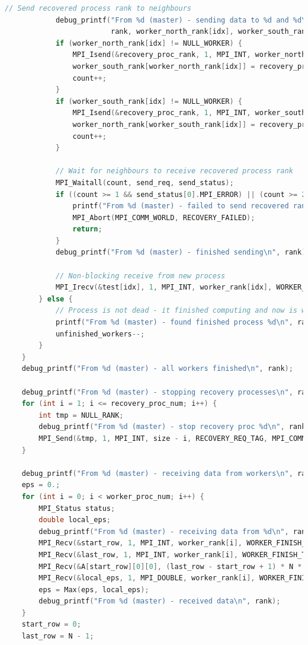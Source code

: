 \documentclass[a4paper]{article}
\begin{document}
\begin{lstlisting}[caption=jac\_3d\_mpi\_ft.c, label={lst:2}, language=C]
            // Send recovered process rank to neighbours
            debug_printf("From %d (master) - sending data to %d and %d\n",
                         rank, worker_north_rank[idx], worker_south_rank[idx]);
            if (worker_north_rank[idx] != NULL_WORKER) {
                MPI_Isend(&recovery_proc_rank, 1, MPI_INT, worker_north_rank[idx], RECOVERY_REQ_TAG, MPI_COMM_WORLD, &send_req[count]);
                worker_south_rank[worker_north_rank[idx]] = recovery_proc_rank;
                count++;
            }
            if (worker_south_rank[idx] != NULL_WORKER) {
                MPI_Isend(&recovery_proc_rank, 1, MPI_INT, worker_south_rank[idx], RECOVERY_REQ_TAG, MPI_COMM_WORLD, &send_req[count]);
                worker_north_rank[worker_south_rank[idx]] = recovery_proc_rank;
                count++;
            }

            // Wait for neighbours to receive recovered process rank
            MPI_Waitall(count, send_req, send_status);
            if ((count >= 1 && send_status[0].MPI_ERROR) || (count >= 2 && send_status[1].MPI_ERROR)) {
                printf("From %d (master) - failed to send recovered rank\n", rank);
                MPI_Abort(MPI_COMM_WORLD, RECOVERY_FAILED);
                return;
            }
            debug_printf("From %d (master) - finished sending\n", rank);

            // Non-blocking receive from new process
            MPI_Irecv(&test[idx], 1, MPI_INT, worker_rank[idx], WORKER_FINISH_TAG, MPI_COMM_WORLD, &test_request[idx]);
        } else {
            // Process is not dead - it finished computing and now is waiting to send its data
            printf("From %d (master) - found finished process %d\n", rank, worker_rank[idx]);
            unfinished_workers--;
        }
    }
    debug_printf("From %d (master) - all workers finished\n", rank);

    debug_printf("From %d (master) - stopping recovery processes\n", rank);
    for (int i = 1; i <= recovery_proc_num; i++) {
        int tmp = NULL_RANK;
        debug_printf("From %d (master) - stop recovery proc %d\n", rank, size - i);
        MPI_Send(&tmp, 1, MPI_INT, size - i, RECOVERY_REQ_TAG, MPI_COMM_WORLD);
    }

    debug_printf("From %d (master) - receiving data from workers\n", rank);
    eps = 0.;
    for (int i = 0; i < worker_proc_num; i++) {
        MPI_Status status;
        double local_eps;
        debug_printf("From %d (master) - receiving data from %d\n", rank, worker_rank[i]);
        MPI_Recv(&start_row, 1, MPI_INT, worker_rank[i], WORKER_FINISH_TAG, MPI_COMM_WORLD, &status);
        MPI_Recv(&last_row, 1, MPI_INT, worker_rank[i], WORKER_FINISH_TAG, MPI_COMM_WORLD, &status);
        MPI_Recv(&A[start_row][0][0], (last_row - start_row + 1) * N * N, MPI_DOUBLE, worker_rank[i], WORKER_FINISH_TAG, MPI_COMM_WORLD, &status);
        MPI_Recv(&local_eps, 1, MPI_DOUBLE, worker_rank[i], WORKER_FINISH_TAG, MPI_COMM_WORLD, &status);
        eps = Max(eps, local_eps);
        debug_printf("From %d (master) - received data\n", rank);
    }
    start_row = 0;
    last_row = N - 1;


\end{lstlisting}
\end{document}
